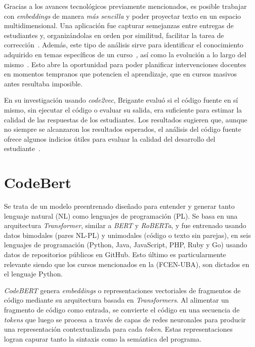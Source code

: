 \documentclass[11pt,a4paper,twoside,openany]{tesis}
\begin{document}
Gracias a los avances tecnológicos previamente mencionados, es posible trabajar con \emph{embeddings} de manera \emph{más sencilla} y poder proyectar texto en un espacio multidimensional. Una aplicación fue capturar semejanzas entre entregas de estudiantes y, organizándolas en orden por similitud, facilitar la tarea de corrección~\cite{simgrade}. Además, este tipo de análisis sirve para identificar el conocimiento adquirido en temas específicos de un curso~\cite{brigante2020evaluation}, así como la evolución a lo largo del mismo~\cite{wu2018zeroshotlearningcode}. Esto abre la oportunidad para poder planificar intervenciones docentes en momentos tempranos que potencien el aprendizaje, que en cursos masivos antes resultaba imposible. 

En su investigación usando \emph{code2vec},  Brigante  evaluó si el código fuente en sí mismo, sin ejecutar el código o evaluar su salida, era suficiente para estimar la calidad de las respuestas de los estudiantes. Los resultados sugieren que, aunque no siempre se alcanzaron los resultados esperados, el análisis del código fuente ofrece algunos indicios útiles para evaluar la calidad del desarrollo del estudiante~\cite{brigante2020evaluation}.


\section{CodeBert}

Se trata de un modelo preentrenado diseñado para entender y generar tanto lenguaje natural (NL) como lenguajes de programación (PL). Se basa en una arquitectura \emph{Transformer}, similar a \emph{BERT} y \emph{RoBERTa}, y fue entrenado usando datos bimodales (pares NL-PL) y unimodales (código o texto sin parejas), en seis lenguajes de programación (Python, Java, JavaScript, PHP, Ruby y Go) usando datos de repositorios públicos en GitHub. Esto último es particularmente relevante siendo que los cursos mencionados en la (FCEN-UBA), son dictados en el lenguaje Python.

\emph{CodeBERT} genera  \emph{embeddings} o representaciones vectoriales de fragmentos de código mediante su arquitectura basada en \emph{Transformers}. Al alimentar un fragmento de código como entrada, se convierte el código en una secuencia de \emph{tokens} que luego se procesa a través de capas de redes neuronales para producir una representación contextualizada para cada \emph{token}. Estas representaciones logran capurar tanto la sintaxis como la semántica del programa.
\end{document}

